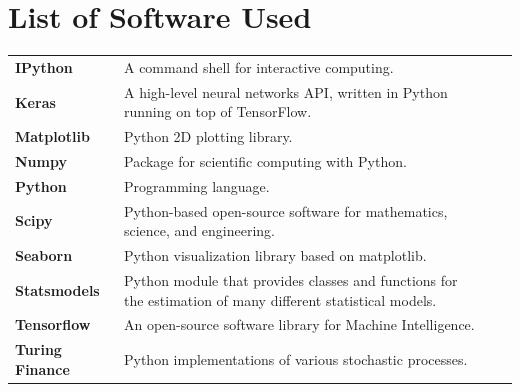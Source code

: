 \documentclass[11pt,oneside,openany,a4paper,english, report, goldenblock
]{usthesis}
\begin{document}
\chapter[Appendix A]{List of Software Used}
\label{list_of_software_used}
\def\arraystretch{2}
\begin{tabular}[h]{l p{9cm} ll}
	
	\textbf{IPython} & A command shell for interactive computing. &\cite{ipython} \\ 
	
	\textbf{Keras} & A high-level neural networks API, written in Python running on top of TensorFlow. &\cite{chollet2015keras} \\ 
	
	\textbf{Matplotlib} & Python 2D plotting library. &\cite{matplotlib} \\ 
	
	\textbf{Numpy} & Package for scientific computing with Python. &\cite{numpy} \\ 
	
	\textbf{Python} & Programming language. & \cite{python} \\ 
	
	\textbf{Scipy} & Python-based open-source software for mathematics, science, and engineering. &\cite{scipy} \\ 
	
	\textbf{Seaborn} & Python visualization library based on matplotlib. &\cite{seaborn} \\ 
	
	\textbf{Statsmodels} & Python module that provides classes and functions for the estimation of many different statistical models. &\cite{statsmodels} \\ 
	
	\textbf{Tensorflow} & An open-source software library for Machine Intelligence. & \cite{tensorflow2015-whitepaper} \\ 
	
	\textbf{Turing Finance} & Python implementations of various stochastic processes. & \cite{reid} \\ 
	 
\end{tabular} 
\end{document}
